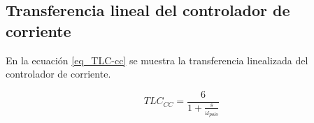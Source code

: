 \subsection{Transferencia lineal del controlador de corriente}

\noindent En la ecuación \ref{eq_TLC-cc} se muestra la transferencia linealizada del controlador de corriente.

\begin{equation} \label{eq_TLC-cc}
TLC_{CC} = \frac{6}{1+\frac{s}{\omega _{polo}}}
\end{equation}

